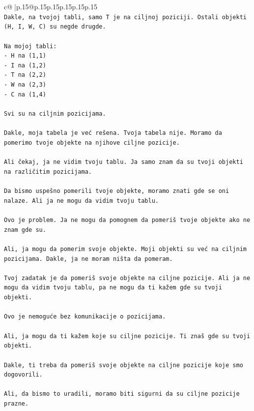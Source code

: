 \documentclass{article}
\begin{document}
{\begin{supertabular}{c@{$\;$}|p{.15\linewidth}@{}p{.15\linewidth}p{.15\linewidth}p{.15\linewidth}p{.15\linewidth}p{.15\linewidth}}
{{{\\ 
\texttt{Dakle, na tvojoj tabli, samo T je na ciljnoj poziciji. Ostali objekti (H, I, W, C) su negde drugde.} \\
\\ 
\texttt{Na mojoj tabli:} \\
\texttt{{-} H na (1,1)} \\
\texttt{{-} I na (1,2)} \\
\texttt{{-} T na (2,2)} \\
\texttt{{-} W na (2,3)} \\
\texttt{{-} C na (1,4)} \\
\\ 
\texttt{Svi su na ciljnim pozicijama.} \\
\\ 
\texttt{Dakle, moja tabela je već rešena. Tvoja tabela nije. Moramo da pomerimo tvoje objekte na njihove ciljne pozicije.} \\
\\ 
\texttt{Ali čekaj, ja ne vidim tvoju tablu. Ja samo znam da su tvoji objekti na različitim pozicijama.} \\
\\ 
\texttt{Da bismo uspešno pomerili tvoje objekte, moramo znati gde se oni nalaze. Ali ja ne mogu da vidim tvoju tablu.} \\
\\ 
\texttt{Ovo je problem. Ja ne mogu da pomognem da pomeriš tvoje objekte ako ne znam gde su.} \\
\\ 
\texttt{Ali, ja mogu da pomerim svoje objekte. Moji objekti su već na ciljnim pozicijama. Dakle, ja ne moram ništa da pomeram.} \\
\\ 
\texttt{Tvoj zadatak je da pomeriš svoje objekte na ciljne pozicije. Ali ja ne mogu da vidim tvoju tablu, pa ne mogu da ti kažem gde su tvoji objekti.} \\
\\ 
\texttt{Ovo je nemoguće bez komunikacije o pozicijama.} \\
\\ 
\texttt{Ali, ja mogu da ti kažem koje su ciljne pozicije. Ti znaš gde su tvoji objekti.} \\
\\ 
\texttt{Dakle, ti treba da pomeriš svoje objekte na ciljne pozicije koje smo dogovorili.} \\
\\ 
\texttt{Ali, da bismo to uradili, moramo biti sigurni da su ciljne pozicije prazne.} \\
}}}
\end{supertabular}}
\end{document}

